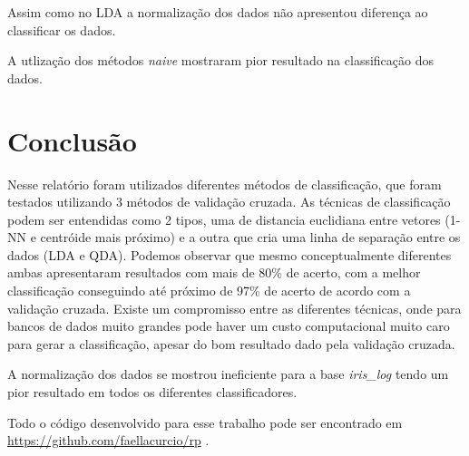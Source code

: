 \documentclass[paper=a4, fontsize=11pt]{scrartcl}
\numberwithin{equation}{section}		%
\numberwithin{figure}{section}			%
\numberwithin{table}{section}				%
\begin{document}
Assim como no LDA a normalização dos dados não apresentou diferença ao classificar os dados.

A utlização dos métodos \textit{naive} mostraram pior resultado na classificação dos dados.

\section{Conclusão}

Nesse relatório foram utilizados diferentes métodos de classificação, que foram testados utilizando 3 métodos de validação cruzada. As técnicas de classificação podem ser entendidas como 2 tipos, uma de distancia euclidiana entre vetores (1-NN e centróide mais próximo) e a outra que cria uma linha de separação entre os dados (LDA e QDA). Podemos observar que mesmo conceptualmente diferentes ambas apresentaram resultados com mais de 80\% de acerto, com a melhor classificação conseguindo até próximo de 97\% de acerto de acordo com a validação cruzada.
Existe um compromisso entre as diferentes técnicas, onde para bancos de dados muito grandes pode haver um custo computacional muito caro para gerar a classificação, apesar do bom resultado dado pela validação cruzada.

A normalização dos dados se mostrou ineficiente para a base \textit{iris\_log} tendo um pior resultado em todos os diferentes classificadores.

Todo o código desenvolvido para esse trabalho pode ser encontrado em \url{https://github.com/faellacurcio/rp} .

\end{document}
